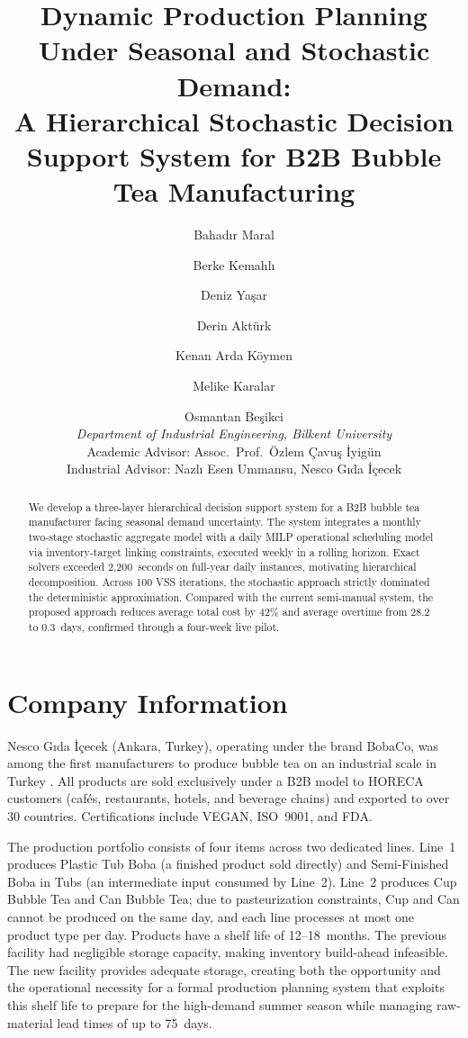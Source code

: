 \documentclass[11pt]{article}
\title{Dynamic Production Planning Under Seasonal and Stochastic Demand:\\[4pt]
\large A Hierarchical Stochastic Decision Support System for B2B Bubble Tea Manufacturing}
\author{
  Bahadır Maral \and Berke Kemahlı \and Deniz Yaşar \and Derin Aktürk \and
  Kenan Arda Köymen \and Melike Karalar \and Osmantan Beşikci\\[6pt]
  {\small\textit{Department of Industrial Engineering, Bilkent University}}\\[2pt]
  {\small Academic Advisor: Assoc.\ Prof.\ Özlem Çavuş İyigün}\\
  {\small Industrial Advisor: Nazlı Esen Ummansu, Nesco Gıda İçecek}
}
\date{}
\begin{document}
\maketitle

\begin{abstract}
We develop a three-layer hierarchical decision support system for a B2B bubble tea manufacturer
facing seasonal demand uncertainty. The system integrates a monthly two-stage stochastic aggregate
model with a daily MILP operational scheduling model via inventory-target linking constraints,
executed weekly in a rolling horizon. Exact solvers exceeded 2,200~seconds on full-year daily
instances, motivating hierarchical decomposition. Across 100 VSS iterations, the stochastic
approach strictly dominated the deterministic approximation. Compared with the current semi-manual
system, the proposed approach reduces average total cost by 42\% and average overtime from 28.2
to 0.3~days, confirmed through a four-week live pilot.
\end{abstract}

\section{Company Information}

Nesco Gıda İçecek (Ankara, Turkey), operating under the brand BobaCo, was among the first manufacturers to produce bubble tea on an industrial scale in Turkey \citep{BobaCo}. All products are sold exclusively under a B2B model to HORECA customers (cafés, restaurants, hotels, and beverage chains) and exported to over 30 countries. Certifications include VEGAN, ISO~9001, and FDA.

The production portfolio consists of four items across two dedicated lines. Line~1 produces Plastic Tub Boba (a finished product sold directly) and Semi-Finished Boba in Tubs (an intermediate input consumed by Line~2). Line~2 produces Cup Bubble Tea and Can Bubble Tea; due to pasteurization constraints, Cup and Can cannot be produced on the same day, and each line processes at most one product type per day. Products have a shelf life of 12--18~months. The previous facility had negligible storage capacity, making inventory build-ahead infeasible. The new facility provides adequate storage, creating both the opportunity and the operational necessity for a formal production planning system that exploits this shelf life to prepare for the high-demand summer season while managing raw-material lead times of up to 75~days.
\end{document}
